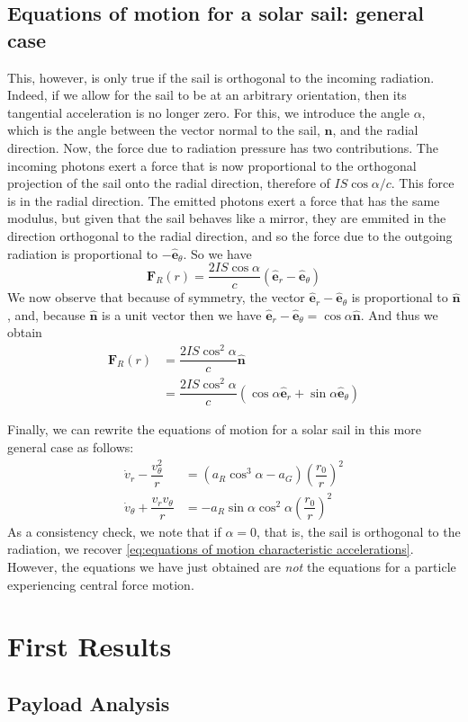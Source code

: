 \documentclass[twocolumn,12pt,a4paper]{article}
\numberwithin{equation}{section}
\begin{document}
\subsection{Equations of motion for a solar sail: general case}
This, however, is only true if the sail is orthogonal to the incoming radiation. Indeed, if we allow for the sail to be at an arbitrary orientation, then its tangential acceleration is no longer zero. For this, we introduce the angle \( \alpha \), which is the angle between the vector normal to the sail, \( \hat{\mathbf{n}} \), and the radial direction. Now, the force due to radiation pressure has two contributions. The incoming photons exert a force that is now proportional to the orthogonal projection of the sail onto the radial direction, therefore of \( IS\cos{\alpha}/c \). This force is in the radial direction. The emitted photons exert a force that has the same modulus, but given that the sail behaves like a mirror, they are emmited in the direction orthogonal to the radial direction, and so the force due to the outgoing radiation is proportional to \( {-\hat{\mathbf{e}}_{\theta}} \). So we have
\begin{equation}
  \mathbf{F}_R(r) = \dfrac{2IS \cos{\alpha}}{c} ( \hat{\mathbf{e}}_{r} - \hat{\mathbf{e}}_{\theta})
\end{equation}
We now observe that because of symmetry, the vector \( \hat{\mathbf{e}}_{r} - \hat{\mathbf{e}}_{\theta}  \) is proportional to \( \hat{\mathbf{n}} \), and, because \( \hat{\mathbf{n}} \) is a unit vector then we have \( \hat{\mathbf{e}}_{r} - \hat{\mathbf{e}}_{\theta} = \cos{\alpha} \hat{\mathbf{n}} \). 
And thus we obtain
\begin{align}
  \mathbf{F}_R(r) &= \dfrac{2IS \cos^2{\alpha}}{c} \hat{\mathbf{n}} \\
									&= \dfrac{2IS \cos^2{\alpha}}{c} (\cos{\alpha} \hat{\mathbf{e}}_r + \sin{\alpha} \hat{\mathbf{e}}_{\theta}) 
\end{align}

Finally, we can rewrite the equations of motion for a solar sail in this more general case as follows:
\begin{align*}
  \dot{v}_r - \dfrac{v_{\theta}^2}{r} &= (a_R \cos^3{\alpha} - a_G) \left(\dfrac{r_0}{r}\right)^2 \\ 
  \dot{v}_{\theta} + \dfrac{v_r v_{\theta}}{r} &= -a_R	\sin{\alpha} \cos^2{\alpha} \left(\dfrac{r_0}{r}\right)^2
\end{align*}
As a consistency check,  we note that if \( \alpha = 0 \), that is, the sail is orthogonal to the radiation, we recover \autoref{eq:equations of motion characteristic accelerations}. However, the equations we have just obtained are \emph{not} the equations for a particle experiencing central force motion.   

\section{First Results}
\subsection{Payload Analysis}
\end{document}

